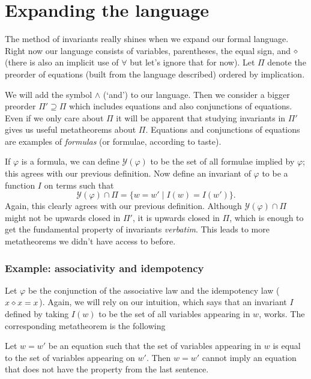 \section{Expanding the language}
The method of invariants really shines when we expand our formal language. Right now our language consists of variables, parentheses, the equal sign, and $\diamond$ (there is also an implicit use of $\forall$ but let's ignore that for now).  Let $\Pi$ denote the preorder of equations (built from the language described) ordered by implication.

We will add the symbol $\wedge$ (`and') to our language. Then we consider a bigger preorder $\Pi' \supseteq \Pi$ which includes equations and also conjunctions of equations. Even if we only care about $\Pi$ it will be apparent that studying invariants in $\Pi'$ gives us useful metatheorems about $\Pi$. Equations and conjunctions of equations are examples of \emph{formulas} (or formulae, according to taste).

If $\varphi$ is a formula, we can define $\mathcal{Y}(\varphi)$ to be the set of all formulae implied by $\varphi$; this agrees with our previous definition. Now define an invariant of $\varphi$ to be a function $I$ on terms such that
\[
\mathcal{Y}(\varphi) \cap \Pi = \{w = w' \mid I(w) = I(w')\}.
\]
Again, this clearly agrees with our previous definition. Although $\mathcal{Y}(\varphi) \cap \Pi$ might not be upwards closed in $\Pi'$, it is upwards closed in $\Pi$, which is enough to get the fundamental property of invariants \emph{verbatim}. This leads to more metatheorems we didn't have access to before.

\subsubsection*{Example: associativity and idempotency}
Let $\varphi$ be the conjunction of the associative law and the idempotency law ($x \diamond x = x$). Again, we will rely on our intuition, which says that an invariant $I$ defined by taking $I(w)$ to be the set of all variables appearing in $w$, works. The corresponding metatheorem is the following

\begin{metatheorem}
	Let $w = w'$ be an equation such that the set of variables appearing in $w$ is equal to the set of variables appearing on $w'$. Then $w = w'$ cannot imply an equation that does not have the property from the last sentence.
\end{metatheorem}

